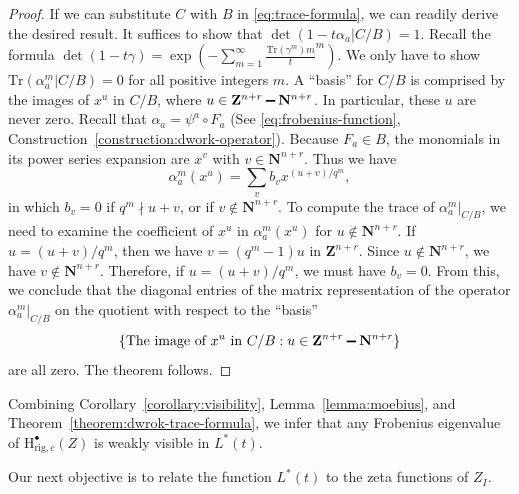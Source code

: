 \documentclass{amsart}
\numberwithin{equation}{section}
\theoremstyle{plain}
\newtheorem{lemma}[equation]{Lemma}
\theoremstyle{definition}
\renewcommand{\mathbb}{\mathbf}
\renewcommand{\setminus}{\mathbin{\rule[0.2em]{0.67em}{0.12em}}}%
\begin{document}
\begin{proof}
If we can substitute \(C\) with \(B\) in \eqref{eq:trace-formula}, we
can readily derive the desired result.  It suffices to show that
\(\det(1 - t\alpha_{a} | C/B) = 1\).  Recall the formula
\(\det(1 - t \gamma) = \exp\left( -\sum_{m=1}^{\infty}
\frac{\mathrm{Tr}(\gamma^m){m}}t^m \right)\).  We only have to show
\(\mathrm{Tr}(\alpha_{a}^{m}| C/B)=0\) for all positive integers
\(m\).  A ``basis'' for \(C/B\) is comprised by the images of
\(x^{u}\) in \(C/B\), where
\(u \in \mathbb{Z}^{n+r} \setminus \mathbb{N}^{n+r}\).  In particular,
these \(u\) are never zero.  Recall that
\(\alpha_{a} = \psi^{a} \circ F_{a}\) (See
\eqref{eq:frobenius-function},
Construction~\ref{construction:dwork-operator}).  Because
\(F_{a} \in B\), the monomials in its power series expansion are
\(x^{v}\) with \(v \in \mathbb{N}^{n+r}\).  Thus we have
\begin{equation*}
\alpha_{a}^{m}(x^{u}) = \sum_{v} b_{v} x^{(u+v)/q^{m}},
\end{equation*}
in which \(b_{v}=0\) if \(q^{m}\nmid u+v\), or if
\(v \notin \mathbb{N}^{n+r}\).  To compute the trace of
\(\alpha_{a}^{m}|_{C/B}\), we need to examine the coefficient of \(x^{u}\)
in \(\alpha_{a}^{m}(x^{u})\) for \(u \notin \mathbb{N}^{n+r}\).  If
\(u = (u+v)/q^{m}\), then we have \(v = (q^{m}-1)u\) in
\(\mathbb{Z}^{n+r}\).  Since \(u \notin \mathbb{N}^{n+r}\), we have
\(v \notin \mathbb{N}^{n+r}\).  Therefore, if \(u = (u+v)/q^{m}\), we
must have \(b_{v}=0\).  From this, we conclude that the diagonal
entries of the matrix representation of the operator
\(\alpha_{a}^{m}|_{C/B}\) on the quotient with respect to the ``basis''
\begin{equation*}
\{\text{The image of }x^{u}\text{ in }C/B : {u\in \mathbb{Z}^{n+r}\setminus\mathbb{N}^{n+r}}\}
\end{equation*}
are all zero.  The theorem follows.
\end{proof}

Combining Corollary~\ref{corollary:visibility}, Lemma~\ref{lemma:moebius}, and
Theorem~\ref{theorem:dwrok-trace-formula}, we infer that any Frobenius
eigenvalue of \(\mathrm{H}^{\bullet}_{\mathrm{rig},c}(Z)\) is weakly visible in
\(L^{\ast}(t)\).

Our next objective is to relate the function \(L^{\ast}(t)\)
to the zeta functions of \(Z_{I}\).


\end{document}
